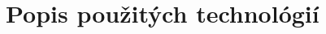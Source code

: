 \documentclass[../projekt.tex]{subfiles}
\begin{document}
\chapter{Popis použitých technológií}\label{technologie}
              
              
\end{document}
